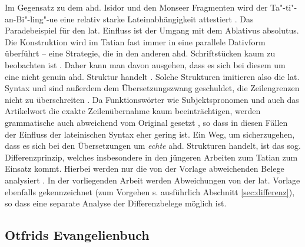 

Im Gegensatz zu dem ahd. Isidor und den Monseer Fragmenten wird der Ta"-ti"-an-Bi"-ling"-ue eine relativ starke Lateinabhängigkeit attestiert \parencites(){Lippert1974}[128]{Sonderegger2003}. Das Paradebeispiel für den lat. Einfluss ist der Umgang mit dem Ablativus absolutus. Die Konstruktion wird im Tatian fast immer in eine parallele Dativform überführt -- eine Strategie, die in den anderen ahd. Schriftstücken kaum zu beobachten ist \parencite[145f]{Lippert1974}. Daher kann man davon ausgehen, dass es sich bei diesem  um eine nicht genuin ahd. Struktur handelt \parencite[zur vertiefenden Diskussion s.][39--40]{Fleischer2011}. Solche Strukturen imitieren also die lat. Syntax und sind außerdem dem Übersetzungszwang geschuldet, die Zeilengrenzen nicht zu überschreiten \parencite[136]{Masser1997}. Da Funktionswörter wie Subjektspronomen und auch das Artikelwort  die exakte Zeilenübernahme kaum beeinträchtigen, werden grammatische  \parencite[43]{Fleischer2011} auch abweichend vom Original gesetzt \parencites[vgl. auch][20]{Dittmer1998}, so dass in diesen Fällen der Einfluss der lateinischen Syntax eher gering ist.  
Ein Weg, um sicherzugehen, dass es sich bei den Übersetzungen um \textit{echte} ahd. Strukturen handelt, ist das sog. Differenzprinzip, welches insbesondere in den jüngeren Arbeiten zum Tatian zum Einsatz kommt. Hierbei werden nur die von der Vorlage abweichenden Belege analysiert \parencite{Dittmer1998,Hinterholzl2005,Fleischer2008}. In der vorliegenden Arbeit werden Abweichungen von der lat. Vorlage ebenfalls gekennzeichnet (zum Vorgehen s. ausführlich Abschnitt \ref{sec:differenz}), so dass eine separate Analyse der Differenzbelege möglich ist.  


\subsection{Otfrids Evangelienbuch}

